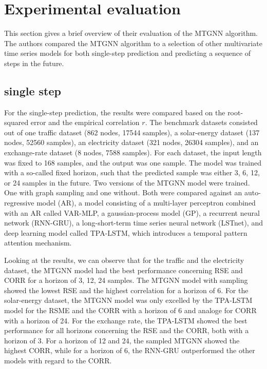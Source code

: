 \documentclass[letterpaper, twocolumn,11pt]{article}
\begin{document}
    \section{Experimental evaluation}
    This section gives a brief overview of their evaluation of the MTGNN algorithm.
    The authors compared the MTGNN algorithm to a selection of other multivariate time series models for both single-step prediction and predicting a sequence of steps in the future.

    \subsection{single step}
    For the single-step prediction, the results were compared based on the root-squared error
    and the empirical correlation $r$.
    The benchmark datasets consisted out of
    one traffic dataset (862 nodes, 17544 samples),
    a solar-energy dataset (137 nodes, 52560 samples),
    an electricity dataset (321 nodes, 26304 samples),
    and an exchange-rate dataset (8 nodes, 7588 samples).
    For each dataset, the input length was fixed to 168 samples, and the output was one sample.
    The model was trained with a so-called fixed horizon, such that the predicted sample was either 3, 6, 12, or 24 samples in the future.
    Two versions of the MTGNN model were trained.
    One with graph sampling and one without.
    Both were compared against an
    auto-regressive model (AR),
    a model consisting of a multi-layer perceptron combined with an AR called VAR-MLP,
    a gaussian-process model (GP),
    a recurrent neural network (RNN-GRU),
    a long-short-term time series neural network (LSTnet),
    and deep learning model called TPA-LSTM, which introduces a temporal pattern attention mechanism.

    Looking at the results, we can observe that for the traffic and the electricity dataset, the MTGNN model had the best performance concerning RSE and CORR for a horizon of 3, 12, 24 samples.
    The MTGNN model with sampling showed the lowest RSE and the highest correlation for a horizon of 6.
    For the solar-energy dataset, the MTGNN model was only excelled by the TPA-LSTM model for the RSME and the CORR with a horizon of 6 and analoge for CORR with a horizon of 24.
    For the exchange rate, the TPA-LSTM showed the best performance for all horizons concerning the RSE and the CORR, both with a horizon of 3.
    For a horizon of 12 and 24, the sampled MTGNN showed the highest CORR, while for a horizon of 6, the RNN-GRU outperformed the other models with regard to the CORR.
\end{document}
